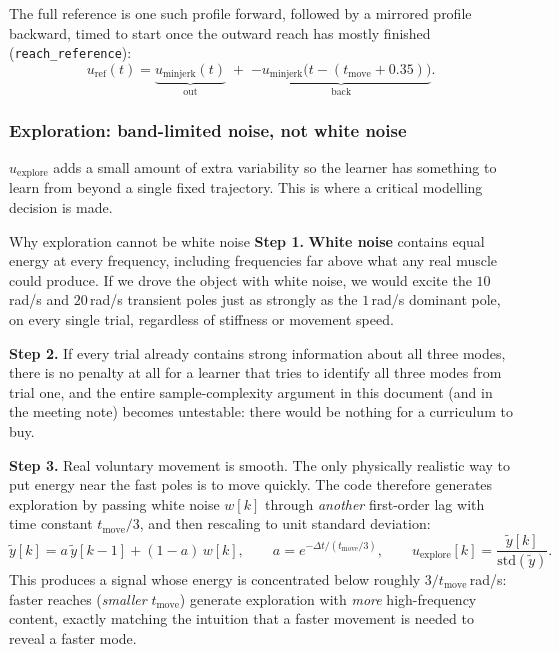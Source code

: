 \documentclass[11pt,a4paper]{article}
\newcommand{\dt}{\Delta t}
\begin{document}
The full reference is one such profile forward, followed by a mirrored
profile backward, timed to start once the outward reach has mostly finished
(\texttt{reach\_reference}):
\[
u_{\mathrm{ref}}(t) = \underbrace{u_{\mathrm{minjerk}}(t)}_{\text{out}}
\;+\; \underbrace{-u_{\mathrm{minjerk}}\bigl(t-(t_{\mathrm{move}}+0.35)\bigr)}_{\text{back}}.
\]

\subsubsection{Exploration: band-limited noise, not white noise}

$u_{\mathrm{explore}}$ adds a small amount of extra variability so the learner
has something to learn from beyond a single fixed trajectory. This is where a
critical modelling decision is made.

\begin{stepbox}{Why exploration cannot be white noise}
\textbf{Step 1.} \textbf{White noise} contains equal energy at every
frequency, including frequencies far above what any real muscle could
produce. If we drove the object with white noise, we would excite the
$10$\,rad/s and $20$\,rad/s transient poles just as strongly as the $1$\,rad/s
dominant pole, on every single trial, regardless of stiffness or movement
speed.

\textbf{Step 2.} If every trial already contains strong information about all
three modes, there is no penalty at all for a learner that tries to identify
all three modes from trial one, and the entire sample-complexity argument in
this document (and in the meeting note) becomes untestable: there would be
nothing for a curriculum to buy.

\textbf{Step 3.} Real voluntary movement is smooth. The only physically
realistic way to put energy near the fast poles is to move quickly. The code
therefore generates exploration by passing white noise $w[k]$ through
\emph{another} first-order lag with time constant $t_{\mathrm{move}}/3$, and
then rescaling to unit standard deviation:
\begin{equation}
\tilde y[k] = a\,\tilde y[k-1] + (1-a)\,w[k], \qquad a=e^{-\dt/(t_{\mathrm{move}}/3)},
\qquad
u_{\mathrm{explore}}[k] = \frac{\tilde y[k]}{\mathrm{std}(\tilde y)}.
\label{eq:bandlimited}
\end{equation}
This produces a signal whose energy is concentrated below roughly
$3/t_{\mathrm{move}}$\,rad/s: faster reaches (\emph{smaller} $t_{\mathrm{move}}$)
generate exploration with \emph{more} high-frequency content, exactly matching
the intuition that a faster movement is needed to reveal a faster mode.
\end{stepbox}
\end{document}
